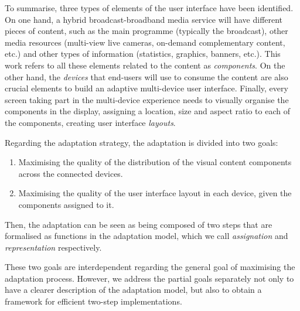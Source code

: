 To summarise, three types of elements of the user interface have been identified.
On one hand, a hybrid broadcast-broadband media service will have different pieces of content, such as the main programme (typically the broadcast), other media resources (multi-view live cameras, on-demand complementary content, etc.) and other types of information (statistics, graphics, banners, etc.). This work refers to all these elements related to the content as \textit{components}. On the other hand, the \textit{devices} that end-users will use to consume the content are also crucial elements to build an adaptive multi-device user interface. Finally, every screen taking part in the multi-device experience needs to visually organise the components in the display, assigning a location, size and aspect ratio to each of the components, creating user interface \textit{layouts}.

Regarding the adaptation strategy, the adaptation is divided into two goals:
\begin{enumerate}
	\item Maximising the quality of the distribution of the visual content components across the connected devices.
	\item Maximising the quality of the user interface layout in each device, given the components assigned to it.
\end{enumerate}

Then, the adaptation can be seen as being composed of two steps that are formalised as functions in the adaptation model, which we call \emph{assignation} and \emph{representation} respectively.

These two goals are interdependent regarding the general goal of maximising the adaptation process. 
However, we address the partial goals separately not only to have a clearer description of the adaptation model, but also to obtain a framework for efficient two-step implementations.

